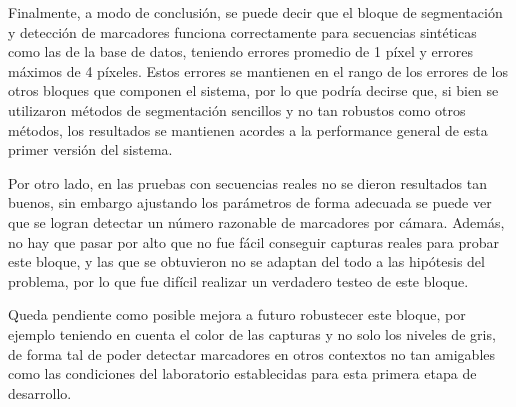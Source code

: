 Finalmente, a modo de conclusión, se puede decir que el bloque de segmentación y detección de marcadores funciona correctamente para secuencias sintéticas como las de la base de datos, teniendo errores promedio de 1 píxel y errores máximos de 4 píxeles. Estos errores se mantienen en el rango de los errores de los otros bloques que componen el sistema, por lo que podría decirse que, si bien se utilizaron métodos de segmentación sencillos y no tan robustos como otros métodos, los resultados se mantienen acordes a la performance general de esta primer versión del sistema.

Por otro lado, en las pruebas con secuencias reales no se dieron resultados tan buenos, sin embargo ajustando los parámetros de forma adecuada se puede ver que se logran detectar un número razonable de marcadores por cámara. Además, no hay que pasar por alto que no fue fácil conseguir capturas reales para probar este bloque, y las que se obtuvieron no se adaptan del todo a las hipótesis del problema, por lo que fue difícil realizar un verdadero testeo de este bloque.

 Queda pendiente como posible mejora a futuro robustecer este bloque, por ejemplo teniendo en cuenta el color de las capturas y no solo los niveles de gris, de forma tal de poder detectar marcadores en otros contextos no tan amigables como las condiciones del laboratorio establecidas para esta primera etapa de desarrollo.